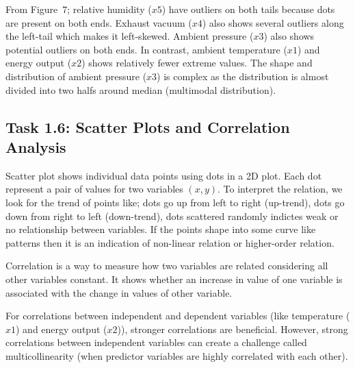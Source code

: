 \documentclass[12pt,a4paper]{article}
\begin{document}
From Figure~7; relative humidity ($x5$) have outliers on both tails because dots are present on both ends. 
Exhaust vacuum ($x4$) also shows several outliers along the left-tail which makes it left-skewed. 
Ambient pressure ($x3$) also shows potential outliers on both ends. 
In contrast, ambient temperature ($x1$) and energy output ($x2$) shows 
relatively fewer extreme values. The shape and distribution of ambient pressure ($x3$) is 
complex as the distribution is almost divided into two halfs around median (multimodal distribution). 



\subsection*{Task 1.6: Scatter Plots and Correlation Analysis}
Scatter plot shows individual data points using dots in a 2D plot. Each dot represent 
a pair of values for two variables $(x,y)$. %
To interpret the 
relation, we look for the trend of points like; dots go up from left to right (up-trend),
dots go down from right to left (down-trend), dots scattered randomly indictes weak or 
no relationship between variables. If the points shape into some curve like patterns then
it is an indication of non-linear relation or higher-order relation.

Correlation is a way to measure how two variables are related 
considering all other variables constant. It shows whether an increase
in value of one variable is associated with the change in values of other variable.

For correlations between independent and dependent variables 
(like temperature ($x1$) and energy output ($x2$)), stronger correlations 
are beneficial. However, strong correlations between independent 
variables can create a challenge called multicollinearity
(when predictor variables are highly correlated with each other).
\end{document}
